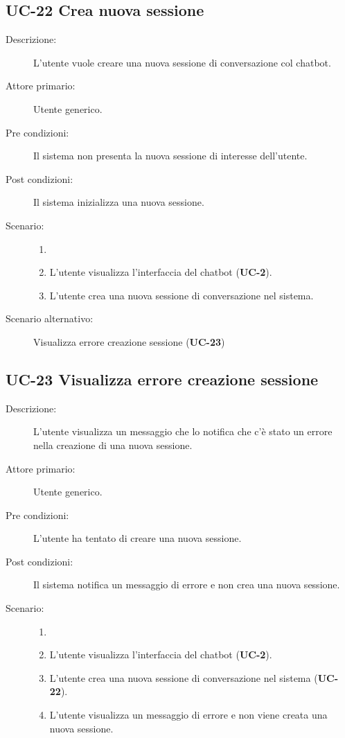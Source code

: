 \subsection{UC-22 Crea nuova sessione}
\begin{description}
    \item[Descrizione:] L'utente vuole creare una nuova sessione di conversazione col chatbot.
    \item[Attore primario:] Utente generico.
    \item[Pre condizioni:] Il sistema non presenta la nuova sessione di interesse dell'utente.
    \item[Post condizioni:] Il sistema inizializza una nuova sessione.
    \item[Scenario:] 
    \begin{enumerate}
        \item[] 
        \item L’utente visualizza l'interfaccia del chatbot (\textbf{UC-2}).
        \item L'utente crea una nuova sessione di conversazione nel sistema.
    \end{enumerate}
    \item[Scenario alternativo:] Visualizza errore creazione sessione (\textbf{UC-23})
\end{description}

\subsection{UC-23 Visualizza errore creazione sessione}
\begin{description}
    \item[Descrizione:] L'utente visualizza un messaggio che lo notifica che c'è stato un errore nella creazione di una nuova sessione.
    \item[Attore primario:] Utente generico.
    \item[Pre condizioni:] L'utente ha tentato di creare una nuova sessione.
    \item[Post condizioni:] Il sistema notifica un messaggio di errore e non crea una nuova sessione.
    \item[Scenario:] 
    \begin{enumerate}
        \item[] 
        \item L’utente visualizza l'interfaccia del chatbot (\textbf{UC-2}).
        \item L'utente crea una nuova sessione di conversazione nel sistema (\textbf{UC-22}).
        \item L'utente visualizza un messaggio di errore e non viene creata una nuova sessione.
    \end{enumerate}
\end{description}


